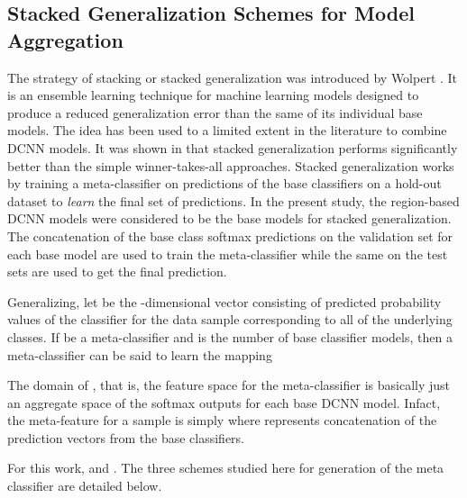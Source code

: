 \documentclass[10pt,conference,a4paper]{IEEEtran}
\begin{document}
\subsection{Stacked Generalization Schemes for Model Aggregation}
The strategy of stacking or stacked generalization was introduced by Wolpert \cite{wolpert1992}. It is an ensemble learning technique for machine learning models designed to produce a reduced generalization error than the same of its individual base models. The idea has been used to a limited extent in the literature to combine DCNN models. It was shown in \cite{roy2016generalized} that stacked generalization performs significantly better than the simple winner-takes-all approaches.
Stacked generalization works by training a meta-classifier on predictions of the base classifiers on a hold-out dataset to \textit{learn} the final set of predictions. In the present study, the region-based DCNN models were considered to be the base models for stacked generalization. The concatenation of the base class softmax predictions on the validation set for each base model are used to train the meta-classifier while the same on the test sets are used to get the final prediction.

Generalizing, let  be the -dimensional vector consisting of predicted probability values of the  classifier for the  data sample corresponding to all of the underlying  classes. If  be a meta-classifier and  is the number of base classifier models, then a meta-classifier can be said to learn the mapping 

The domain of , that is, the feature space for the meta-classifier is basically just an aggregate space of the softmax outputs for each base DCNN model. Infact, the meta-feature for a sample  is simply  where  represents concatenation of the prediction vectors from the base classifiers.

For this work,  and . The three schemes studied here for generation of the meta classifier are detailed below.
\end{document}
